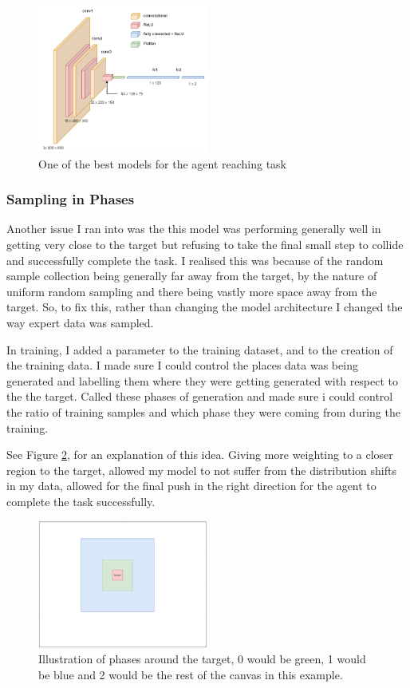 \begin{figure}[h]
  \centering
  \includegraphics[width=0.5\textwidth]{assets/early-work/cnn-diagram.png}
  \caption{One of the best models for the agent reaching task}\label{fig:cnn-5050}
\end{figure}

\subsubsection{Sampling in Phases}
Another issue I ran into was the this model was performing generally well in getting very close to the target but refusing to take the final small step to collide and successfully complete the task. I realised this was because of the random sample collection being generally far away from the target, by the nature of uniform random sampling and there being vastly more space away from the target. So, to fix this, rather than changing the model architecture I changed the way expert data was sampled.

In training, I added a parameter to the training dataset, and to the creation of the training data. I made sure I could control the places data was being generated and labelling them where they were getting generated with respect to the the target. Called these phases of generation and made sure i could control the ratio of training samples and which phase they were coming from during the training. 

See Figure \ref{fig:phase-regions}, for an explanation of this idea. Giving more weighting to a closer region to the target, allowed my model to not suffer from the distribution shifts in my data, allowed for the final push in the right direction for the agent to complete the task successfully.

\begin{figure}[htbp]
  \centering
  \includegraphics[width=0.5\textwidth]{assets/early-work/regions.png}
  \caption{Illustration of phases around the target, 0 would be green, 1 would be blue and 2 would be the rest of the canvas in this example. }\label{fig:phase-regions}
\end{figure}



